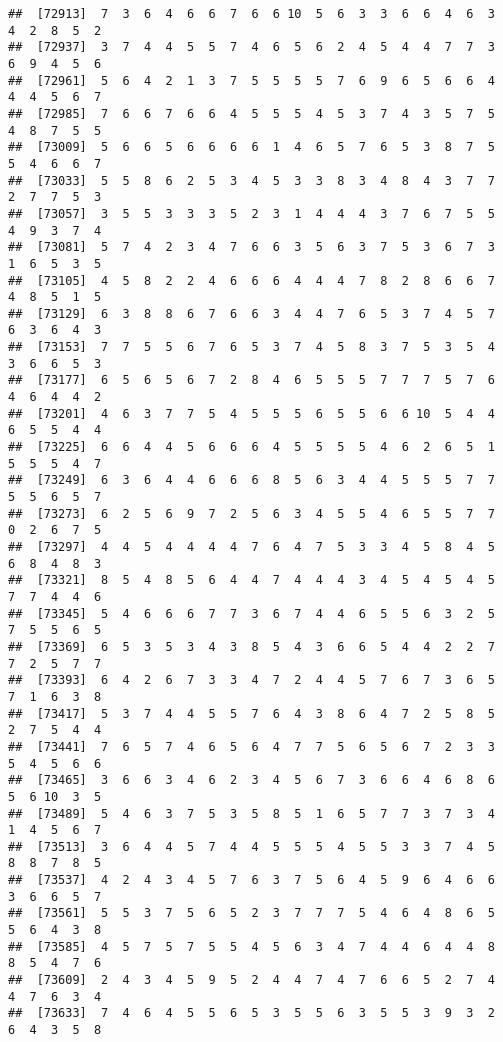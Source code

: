 \documentclass[
]{book}
\begin{document}
\begin{verbatim}
##  [72913]  7  3  6  4  6  6  7  6  6 10  5  6  3  3  6  6  4  6  3  4  2  8  5  2
##  [72937]  3  7  4  4  5  5  7  4  6  5  6  2  4  5  4  4  7  7  3  6  9  4  5  6
##  [72961]  5  6  4  2  1  3  7  5  5  5  5  7  6  9  6  5  6  6  4  4  4  5  6  7
##  [72985]  7  6  6  7  6  6  4  5  5  5  4  5  3  7  4  3  5  7  5  4  8  7  5  5
##  [73009]  5  6  6  5  6  6  6  6  1  4  6  5  7  6  5  3  8  7  5  5  4  6  6  7
##  [73033]  5  5  8  6  2  5  3  4  5  3  3  8  3  4  8  4  3  7  7  2  7  7  5  3
##  [73057]  3  5  5  3  3  3  5  2  3  1  4  4  4  3  7  6  7  5  5  4  9  3  7  4
##  [73081]  5  7  4  2  3  4  7  6  6  3  5  6  3  7  5  3  6  7  3  1  6  5  3  5
##  [73105]  4  5  8  2  2  4  6  6  6  4  4  4  7  8  2  8  6  6  7  4  8  5  1  5
##  [73129]  6  3  8  8  6  7  6  6  3  4  4  7  6  5  3  7  4  5  7  6  3  6  4  3
##  [73153]  7  7  5  5  6  7  6  5  3  7  4  5  8  3  7  5  3  5  4  3  6  6  5  3
##  [73177]  6  5  6  5  6  7  2  8  4  6  5  5  5  7  7  7  5  7  6  4  6  4  4  2
##  [73201]  4  6  3  7  7  5  4  5  5  5  6  5  5  6  6 10  5  4  4  6  5  5  4  4
##  [73225]  6  6  4  4  5  6  6  6  4  5  5  5  5  4  6  2  6  5  1  5  5  5  4  7
##  [73249]  6  3  6  4  4  6  6  6  8  5  6  3  4  4  5  5  5  7  7  5  5  6  5  7
##  [73273]  6  2  5  6  9  7  2  5  6  3  4  5  5  4  6  5  5  7  7  0  2  6  7  5
##  [73297]  4  4  5  4  4  4  4  7  6  4  7  5  3  3  4  5  8  4  5  6  8  4  8  3
##  [73321]  8  5  4  8  5  6  4  4  7  4  4  4  3  4  5  4  5  4  5  7  7  4  4  6
##  [73345]  5  4  6  6  6  7  7  3  6  7  4  4  6  5  5  6  3  2  5  7  5  5  6  5
##  [73369]  6  5  3  5  3  4  3  8  5  4  3  6  6  5  4  4  2  2  7  7  2  5  7  7
##  [73393]  6  4  2  6  7  3  3  4  7  2  4  4  5  7  6  7  3  6  5  7  1  6  3  8
##  [73417]  5  3  7  4  4  5  5  7  6  4  3  8  6  4  7  2  5  8  5  2  7  5  4  4
##  [73441]  7  6  5  7  4  6  5  6  4  7  7  5  6  5  6  7  2  3  3  5  4  5  6  6
##  [73465]  3  6  6  3  4  6  2  3  4  5  6  7  3  6  6  4  6  8  6  5  6 10  3  5
##  [73489]  5  4  6  3  7  5  3  5  8  5  1  6  5  7  7  3  7  3  4  1  4  5  6  7
##  [73513]  3  6  4  4  5  7  4  4  5  5  5  4  5  5  3  3  7  4  5  8  8  7  8  5
##  [73537]  4  2  4  3  4  5  7  6  3  7  5  6  4  5  9  6  4  6  6  3  6  6  5  7
##  [73561]  5  5  3  7  5  6  5  2  3  7  7  7  5  4  6  4  8  6  5  5  6  4  3  8
##  [73585]  4  5  7  5  7  5  5  4  5  6  3  4  7  4  4  6  4  4  8  8  5  4  7  6
##  [73609]  2  4  3  4  5  9  5  2  4  4  7  4  7  6  6  5  2  7  4  4  7  6  3  4
##  [73633]  7  4  6  4  5  5  6  5  3  5  5  6  3  5  5  3  9  3  2  6  4  3  5  8

\end{verbatim}
\end{document}
